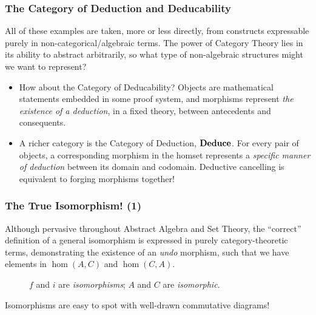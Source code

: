 \documentclass{beamer}
\numberwithin{figure}{section}
\DeclareMathOperator{\cathom}{hom}
\DeclareMathOperator{\catdeduce}{\text{\textbf{Deduce}}}
\begin{document}
\begin{frame}
        \frametitle{The Category of Deduction and Deducability}
        All of these examples are taken, more or less directly, from constructs
        expressable purely in non-categorical/algebraic terms. The power of
        Category Theory lies in its ability to abstract arbitrarily, so what
        type of non-algebraic structures might we want to represent?
        \pause
        \begin{itemize}
                \item How about the Category of Deducability? Objects are
                        mathematical statements embedded in some proof system,
                        and morphisms represent \emph{the existence of a
                        deduction}, in a fixed theory, between antecedents and
                        consequents.
                \item A richer category is the Category of Deduction,
                        $\catdeduce$. For every pair of objects, a corresponding
                        morphism in the homset represents a \emph{specific
                        manner of deduction} between its domain and codomain.
                        Deductive cancelling is equivalent to forging morphisms
                        together!
        \end{itemize}
\end{frame}

\begin{frame}
        \frametitle{The True Isomorphism! (1)}
        Although pervasive throughout Abstract Algebra and Set Theory, the
        ``correct'' definition of a general isomorphism is expressed in purely
        category-theoretic terms, demonstrating the existence of an \emph{undo}
        morphism, such that we have elements in $\cathom(A,C)$ and
        $\cathom(C,A)$.
        \pause
        \begin{figure}
                \caption{$f$ and $i$ are \emph{isomorphisms}; $A$ and $C$ are
                        \emph{isomorphic}.}
        \end{figure}
        \pause
        Isomorphisms are easy to spot with well-drawn commutative diagrams!
\end{frame}
\end{document}
